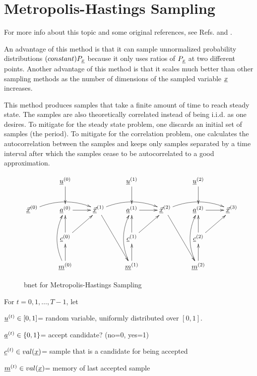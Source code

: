 \section{Metropolis-Hastings Sampling}

For more info about this topic and 
some original references, 
see Refs.\cite{bendel-metro-hast}
and \cite{wiki-metro-hast}.

An advantage of this method is that it can sample
unnormalized probability distributions
$(constant)P_\rvx$ 
because it 
only uses ratios of
$P_\rvx$ at two different points.
Another advantage
of this method
is that it scales much 
better than other sampling
methods as the number
of dimensions of the
sampled variable $\rvx$
increases.

This method produces samples that 
take a finite amount of
time to reach steady state. The samples
are also
theoretically correlated instead
of being i.i.d. as one desires.
To mitigate for the steady state problem,
one discards an initial set
of samples (the  period).
To mitigate for the correlation problem,
one calculates the autocorrelation
between the samples
and keeps only samples separated
by a time interval 
after which the samples 
cease to be autocorrelated to
a good approximation.



\begin{figure}[h!]
$$\xymatrix{
&\rvu^{(0)}\ar[d]
&&\rvu^{(1)}\ar[d]
&&\rvu^{(2)}\ar[d]
\\
\ul{\vecx}^{(0)}\ar@/^1pc/[rr]
&\rva^{(0)}\ar[r]
&
\ul{\vecx}^{(1)}\ar@/^1pc/[rr]\ar[rdd]
&\rva^{(1)}\ar[r]
&
\ul{\vecx}^{(2)}\ar@/^1pc/[rr]\ar[rdd]
&\rva^{(2)}\ar[r]
&\ul{\vecx}^{(3)}
\\
&\rvc^{(0)}\ar[u]\ar[ru]
&&\rvc^{(1)}\ar[u]\ar[ru]
&&\rvc^{(2)}\ar[u]\ar[ru]
\\
&\rvm^{(0)}\ar[u]\ar@/^1pc/[uu]
&&\rvm^{(1)}\ar[u]\ar@/^1pc/[uu]
&&\rvm^{(2)}\ar[u]\ar@/^1pc/[uu]
}$$
\caption{bnet for Metropolis-Hastings Sampling}
\label{fig-mcmc-metro-bnet}
\end{figure}

For $t=0, 1, \dots, T-1$, let

$\rvu^{(t)}\in [0,1]$= random variable,
uniformly
distributed over $[0,1]$.

$\rva^{(t)}\in \bool$= accept candidate? (no=0, yes=1)

$\rvc^{(t)}\in val(\rvx)$= sample that is a
candidate for being accepted

$\rvm^{(t)}\in val(\rvx)$= memory
of last accepted sample

